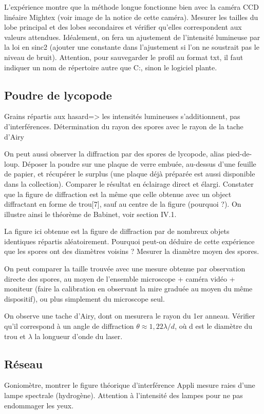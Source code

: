 \documentclass{article}%
\begin{document}
    L'expérience montre que la méthode longue fonctionne bien avec la caméra CCD linéaire Mightex (voir image de la notice de cette caméra). Mesurer les tailles du lobe principal et des lobes secondaires et vérifier qu'elles correspondent aux valeurs attendues. Idéalement, on fera un ajustement de l'intensité lumineuse par la loi en sinc2 (ajouter une constante dans l'ajustement si l'on ne soustrait pas le niveau de bruit). Attention, pour sauvegarder le profil au format txt, il faut indiquer un nom de répertoire autre que C:, sinon le logiciel plante.
\subsection{Poudre de lycopode}
Grains répartis aux hasard=> les intensités lumineuses s'additionnent, pas d'interférences. Détermination du rayon des spores avec le rayon de la tache d'Airy

On peut aussi observer la diffraction par des spores de lycopode, alias pied-de-loup. Déposer la poudre sur une plaque de verre embuée, au-dessus d'une feuille de papier, et récupérer le surplus (une plaque déjà préparée est aussi disponible dans la collection). Comparer le résultat en éclairage direct et élargi. Constater que la figure de diffraction est la même que celle obtenue avec un object diffractant en forme de trou[7], sauf au centre de la figure (pourquoi ?). On illustre ainsi le théorème de Babinet, voir section IV.1.

La figure ici obtenue est la figure de diffraction par de nombreux objets identiques répartis aléatoirement. Pourquoi peut-on déduire de cette expérience que les spores ont des diamètres voisins ? Mesurer la diamètre moyen des spores.

On peut comparer la taille trouvée avec une mesure obtenue par observation directe des spores, au moyen de l'ensemble microscope + caméra vidéo + moniteur (faire la calibration en observant la mire graduée au moyen du même dispositif), ou plus simplement du microscope seul.

On observe une tache d'Airy, dont on mesurera le rayon du 1er anneau. Vérifier qu'il correspond à un angle de diffraction $\theta\approx 1,22 \lambda/d$, où d est le diamètre du trou et $\lambda$ la longueur d'onde du laser.


\subsection{Réseau}
Goniomètre, montrer le figure théorique d'interférence
Appli mesure raies d'une lampe spectrale (hydrogène). Attention à l'intensité des lampes pour ne pas endommager les yeux.
\end{document}
